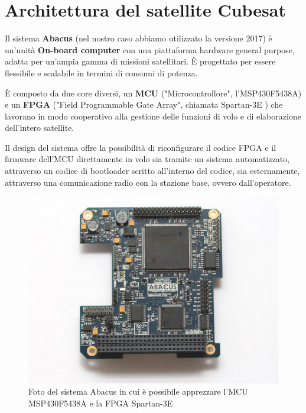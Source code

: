 \documentclass[LaM,binding=0.6cm]{../sapthesis}
\begin{document}
\section{ Architettura del satellite Cubesat }

Il sistema \textbf{Abacus} (nel nostro caso abbiamo utilizzato la versione 2017) è un'unità \textbf{On-board computer} con una piattaforma hardware general purpose, adatta per un'ampia
gamma di missioni satellitari. È progettato per essere flessibile e scalabile in termini di consumi di
potenza. 

È composto da due core diversi, un \textbf{MCU} ("Microcontrollore", l'MSP430F5438A) e un \textbf{FPGA} ("Field Programmable Gate Array", chiamata Spartan-3E ) che lavorano in modo cooperativo alla gestione delle funzioni di volo e di elaborazione dell'intero satellite.

Il design del sistema offre la possibilità di riconfigurare il codice FPGA e il firmware dell'MCU direttamente in volo sia tramite un sistema automatizzato, attraverso un codice di bootloader scritto all'interno del codice, sia esternamente, attraverso una comunicazione radio con la stazione base, ovvero dall'operatore.

    \begin{figure}[htbp]
    \centerline{\includegraphics[scale=.67]{examples/AbacusImage.PNG}}
    \caption{Foto del sistema Abacus in cui è possibile apprezzare l'MCU MSP430F5438A e la FPGA Spartan-3E}
    \label{fig}
    \end{figure}
    \clearpage
    
\end{document}

